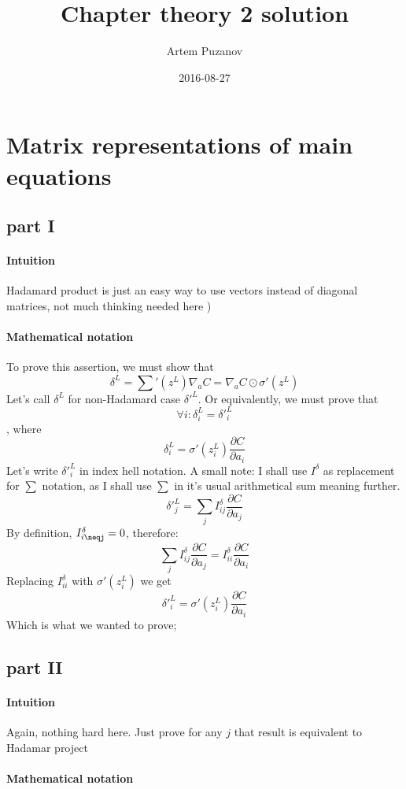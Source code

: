 \documentclass{article}
\title{Chapter theory 2 solution}
\date{2016-08-27}
\author{Artem Puzanov}
\begin{document}
\maketitle
{}
\newpage
{}

\section{Matrix representations of main equations}
\subsection{part I}
\paragraph{Intuition}
Hadamard product is just an easy way to use vectors instead of diagonal matrices, not much thinking needed here )
\paragraph{Mathematical notation}
To prove this assertion, we must show that 
$$\delta^L = {\sum}'(z^L)\nabla_aC = \nabla_aC\odot\sigma'(z^L)$$
Let's call $\delta^L$ for non-Hadamard case $\delta'^L$.
Or equivalently, we must prove that $$\forall i: \delta^L_i = \delta'^L_i$$,
where $$\delta^L_i = \sigma'(z_i^L)\frac{\partial C}{\partial a_i}$$
Let's write $\delta'^L_i$ in index hell notation. 
A small note: I shall use $I^{\delta}$ as replacement for $\sum$ notation, as I shall use $\sum$ in it's usual arithmetical sum meaning further.
$$\delta'^L_j = {\sum}_{j}I^{\delta}_{ij}\frac{\partial C}{\partial a_j}$$
By definition, $I^{\delta}_{i\neqj} = 0$, therefore:
$${\sum}_{j}I^{\delta}_{ij}\frac{\partial C}{\partial a_j} = I^{\delta}_{ii} \frac{\partial C}{\partial a_i}$$
Replacing $I^{\delta}_{ii}$ with $\sigma'(z_i^L)$ we get 
$$\delta'^L_i = \sigma'(z_i^L)\frac{\partial C}{\partial a_i}$$
Which is what we wanted to prove;

\subsection{part II}
\paragraph{Intuition}
Again, nothing hard here. Just prove for any $j$ that result is equivalent to Hadamar project
\paragraph{Mathematical notation}
\end{document}
